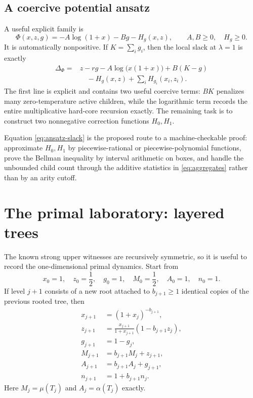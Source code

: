 \documentclass[11pt,a4paper]{article}
\theoremstyle{definition}
\theoremstyle{remark}
\newcommand{\1}{\mathbf 1}
\begin{document}
\subsection{A coercive potential ansatz}

A useful explicit family is
\begin{equation}
  \Phi(x,z,g)
  =-A\log(1+x)-Bg-H_g(x,z),
  \qquad A,B\ge0,\quad H_g\ge0.
  \label{eq:ansatz}
\end{equation}
It is automatically nonpositive.  If $K=\sum_i g_i$, then the local slack at $\lambda=1$
is exactly
\begin{align}
  \Delta_\Phi
  ={}&z-rg
  -A\log\bigl(x(1+x)\bigr)
  +B(K-g)
  \nonumber\\
  &\quad
  -H_g(x,z)+\sum_i H_{g_i}(x_i,z_i).
  \label{eq:ansatz-slack}
\end{align}
The first line is explicit and contains two useful coercive terms:
$B K$ penalizes many zero-temperature active children, while the logarithmic term records the
entire multiplicative hard-core recursion exactly.  The remaining task is to construct two
nonnegative correction functions $H_0,H_1$.

Equation \eqref{eq:ansatz-slack} is the proposed route to a machine-checkable proof: approximate
$H_0,H_1$ by piecewise-rational or piecewise-polynomial functions, prove the Bellman inequality
by interval arithmetic on boxes, and handle the unbounded child count through the additive
statistics in \eqref{eq:aggregates} rather than by an arity cutoff.

\section{The primal laboratory: layered trees}

The known strong upper witnesses are recursively symmetric, so it is useful to record the
one-dimensional primal dynamics.  Start from
\[
  x_0=1,
  \quad z_0=\frac12,
  \quad g_0=1,
  \quad M_0=\frac12,
  \quad A_0=1,
  \quad n_0=1.
\]
If level $j+1$ consists of a new root attached to $b_{j+1}\ge1$ identical copies of the
previous rooted tree, then
\begin{align}
  x_{j+1}&=(1+x_j)^{-b_{j+1}},
  \label{eq:layer-x}\\
  z_{j+1}&=\frac{x_{j+1}}{1+x_{j+1}}
              \left(1-b_{j+1}z_j\right),
  \label{eq:layer-z}\\
  g_{j+1}&=1-g_j,
  \label{eq:layer-g}\\
  M_{j+1}&=b_{j+1}M_j+z_{j+1},
  \label{eq:layer-mu}\\
  A_{j+1}&=b_{j+1}A_j+g_{j+1},
  \label{eq:layer-alpha}\\
  n_{j+1}&=1+b_{j+1}n_j.
  \label{eq:layer-n}
\end{align}
Here $M_j=\mu(T_j)$ and $A_j=\alpha(T_j)$ exactly.
\end{document}
